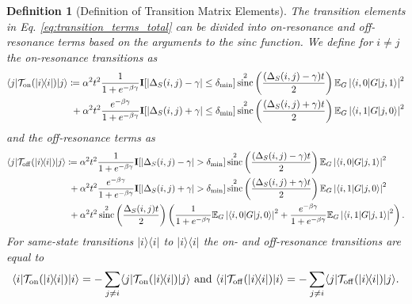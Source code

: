 \documentclass[
 amsmath,amssymb,
 aps,
onecolumn, 
nofootinbib]{revtex4-2}
\newtheorem{definition}[theorem]{Definition}
\newcommand{\on}{\rm on}
\newcommand{\off}{\rm off}
\newcommand{\ket}[1]{|#1\rangle}
\newcommand{\bra}[1]{\langle #1|}
\newcommand{\ketbra}[2]{| #1\rangle\! \langle #2|}
\newcommand{\abs}[1]{\left| #1 \right|}
\newcommand{\EE}{\mathbb{E}}
\newcommand{\TT}{\mathcal{T}}
\DeclareMathOperator{\sinc}{sinc}
\begin{document}
\begin{definition}[Definition of Transition Matrix Elements]\label{def:transition}
The transition elements in Eq. \eqref{eq:transition_terms_total} can be divided into on-resonance and off-resonance terms based on the arguments to the sinc function. We define for $i \neq j$ the on-resonance transitions as
\begin{align}
    \bra{j} \TT_{\on}(\ketbra{i}{i})\ket{j} &\coloneqq \alpha^2 t^2 \frac{1}{1 + e^{-\beta \gamma}} \mathbf{I}[|\Delta_S(i,j) - \gamma| \le \delta_{\min}]  \sinc^2\left(\frac{(\Delta_S(i,j) - \gamma)t}{2}\right) \EE_G \abs{\bra{i, 0} G \ket{j, 1}}^2 \nonumber \\
    &~+ \alpha^2 t^2 \frac{e^{-\beta \gamma}}{1 + e^{-\beta \gamma}} \mathbf{I}[|\Delta_S(i,j) + \gamma| \le \delta_{\min}]  \sinc^2\left(\frac{(\Delta_S(i,j) + \gamma)t}{2}\right)  \EE_G \abs{\bra{i, 1} G \ket{j, 0}}^2 \label{eq:on_resonance}
\end{align}
and the off-resonance terms as
\begin{equation}
\begin{split}
    \bra{j} \TT_{\off}(\ketbra{i}{i})\ket{j} &\coloneqq \alpha^2 t^2 \frac{1}{1 + e^{-\beta \gamma}} \mathbf{I}[|\Delta_S(i,j) - \gamma| > \delta_{\min}]  \sinc^2\left(\frac{(\Delta_S(i,j) - \gamma)t}{2}\right) \EE_G \abs{\bra{i, 0} G \ket{j, 1}}^2 \\
    &~+ \alpha^2 t^2 \frac{e^{-\beta \gamma}}{1 + e^{-\beta \gamma}} \mathbf{I}[|\Delta_S(i,j) + \gamma| > \delta_{\min}]  \sinc^2\left(\frac{(\Delta_S(i,j) + \gamma)t}{2}\right) \EE_G \abs{\bra{i, 1} G \ket{j, 0}}^2  \\
    &~+ \alpha^2 t^2 \sinc^2 \left( \frac{\Delta_S(i,j)t}{2} \right) \left(\frac{1}{1 + e^{-\beta \gamma}} \EE_G \abs{\bra{i, 0} G \ket{j, 0}}^2 + \frac{e^{-\beta \gamma}}{1 + e^{-\beta \gamma}} \EE_G \abs{\bra{i, 1} G \ket{j, 1}}^2 \right). \label{eq:off_resonance}
    \end{split}
\end{equation}
For same-state transitions $\ketbra{i}{i}$ to $\ketbra{i}{i}$ the on- and off-resonance transitions are equal to
\begin{equation}
    \bra{i} \TT_{\on}(\ketbra{i}{i}) \ket{i} = - \sum_{j \neq i}\bra{j} \TT_{\on}(\ketbra{i}{i}) \ket{j} \text{ and } \bra{i} \TT_{\off}(\ketbra{i}{i}) \ket{i} = - \sum_{j \neq i}\bra{j} \TT_{\off}(\ketbra{i}{i}) \ket{j}.\label{eq:same_state_transition_resonances}
\end{equation}
\end{definition}
\end{document}
